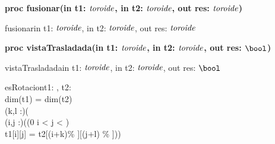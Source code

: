 \documentclass[spanish, a4paper]{article}
\begin{document}
\begin{ejercicio}[:] \textbf{proc fusionar(in t1: $\textit{toroide}$, in t2: $\textit{toroide}$, out res: $\textit{toroide}$)}
\\

\begin{proc}{fusionar}{in t1: $\textit{toroide}$, in t2: $\textit{toroide}$, out res: $\textit{toroide}$}{}

\end{proc}

\end{ejercicio}


\begin{ejercicio}[:] \textbf{proc vistaTrasladada(in t1: $\textit{toroide}$, in t2: $\textit{toroide}$, out res: $\bool$)}\\

\begin{proc}{vistaTrasladada}{in t1: $\textit{toroide}$, in t2: $\textit{toroide}$, out res: $\bool$}{}

\end{proc}

\begin{pred}{esRotacion}{t1: \toroide, t2: \toroide}{ \\
    dim(t1) = dim(t2) \yLuego \\
    (\exists k,l :\ent)( \\
    (\forall i,j :\ent)((0 \leq i <   \leq j < ) \implicaLuego \\
    t1[i][j] = t2[(i+k)\% ][(j+l) \% ]))  \\
}

\end{pred}

\end{ejercicio}
\end{document}
